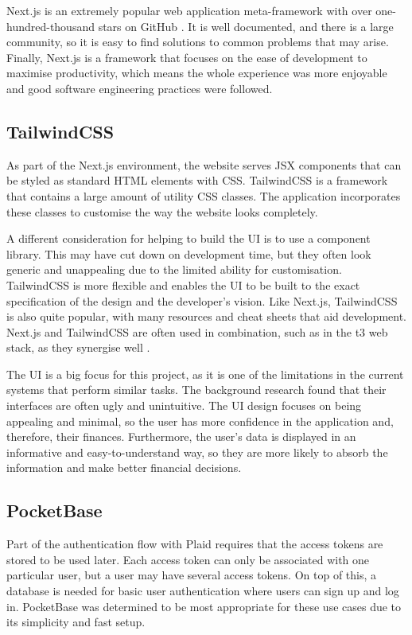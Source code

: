Next.js is an extremely popular web application meta-framework with over one-hundred-thousand stars on GitHub \cite{NextGitHub}. It is well documented, and there is a large community, so it is easy to find solutions to common problems that may arise. Finally, Next.js is a framework that focuses on the ease of development to maximise productivity, which means the whole experience was more enjoyable and good software engineering practices were followed.

\subsection{TailwindCSS}
As part of the Next.js environment, the website serves JSX components that can be styled as standard HTML elements with CSS. TailwindCSS is a framework that contains a large amount of utility CSS classes. The application incorporates these classes to customise the way the website looks completely.

A different consideration for helping to build the UI is to use a component library. This may have cut down on development time, but they often look generic and unappealing due to the limited ability for customisation. TailwindCSS is more flexible and enables the UI to be built to the exact specification of the design and the developer's vision. Like Next.js, TailwindCSS is also quite popular, with many resources and cheat sheets that aid development. Next.js and TailwindCSS are often used in combination, such as in the t3 web stack, as they synergise well \cite{T3Stack}.

The UI is a big focus for this project, as it is one of the limitations in the current systems that perform similar tasks. The background research found that their interfaces are often ugly and unintuitive. The UI design focuses on being appealing and minimal, so the user has more confidence in the application and, therefore, their finances. Furthermore, the user's data is displayed in an informative and easy-to-understand way, so they are more likely to absorb the information and make better financial decisions.

\subsection{PocketBase}
Part of the authentication flow with Plaid requires that the access tokens are stored to be used later. Each access token can only be associated with one particular user, but a user may have several access tokens. On top of this, a database is needed for basic user authentication where users can sign up and log in. PocketBase was determined to be most appropriate for these use cases due to its simplicity and fast setup.

